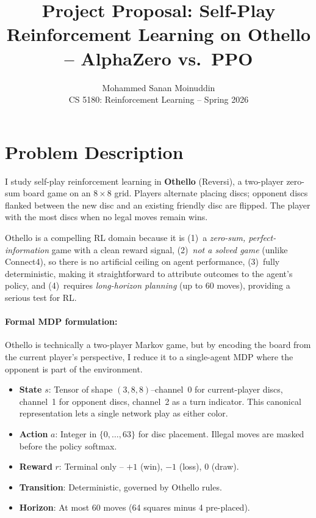 \documentclass[10pt]{article}
\title{\vspace{-1.5em}Project Proposal: Self-Play Reinforcement Learning on Othello -- AlphaZero vs.\ PPO\vspace{-0.5em}}
\author{Mohammed Sanan Moinuddin\\
\small CS 5180: Reinforcement Learning -- Spring 2026}
\date{\vspace{-1em}}
\begin{document}
\maketitle
\thispagestyle{empty}

\section{Problem Description}

I study self-play reinforcement learning in \textbf{Othello} (Reversi), a two-player zero-sum board game on an $8\times 8$ grid. Players alternate placing discs; opponent discs flanked between the new disc and an existing friendly disc are flipped. The player with the most discs when no legal moves remain wins.

Othello is a compelling RL domain because it is (1)~a \emph{zero-sum, perfect-information} game with a clean reward signal, (2)~\emph{not a solved game} (unlike Connect4), so there is no artificial ceiling on agent performance, (3)~fully deterministic, making it straightforward to attribute outcomes to the agent's policy, and (4)~requires \emph{long-horizon planning} (up to 60 moves), providing a serious test for RL.

\paragraph{Formal MDP formulation:} Othello is technically a two-player Markov game, but by encoding the board from the current player's perspective, I reduce it to a single-agent MDP where the opponent is part of the environment.
\begin{itemize}[nosep,leftmargin=*]
    \item \textbf{State} $s$: Tensor of shape $(3, 8, 8)$--channel~0 for current-player discs, channel~1 for opponent discs, channel~2 as a turn indicator. This canonical representation lets a single network play as either color.
    \item \textbf{Action} $a$: Integer in $\{0, \dots, 63\}$ for disc placement. Illegal moves are masked before the policy softmax.
    \item \textbf{Reward} $r$: Terminal only -- $+1$ (win), $-1$ (loss), $0$ (draw).
    \item \textbf{Transition}: Deterministic, governed by Othello rules.
    \item \textbf{Horizon}: At most 60 moves (64 squares minus 4 pre-placed).
\end{itemize}
\end{document}
